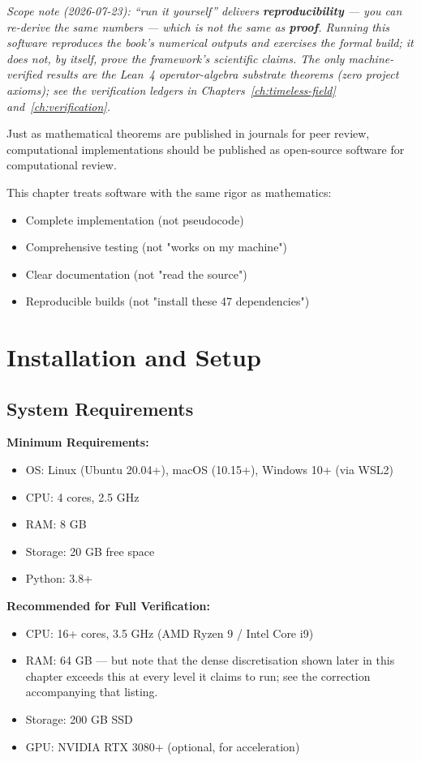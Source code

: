 \medskip
\noindent\emph{Scope note (2026-07-23): ``run it yourself'' delivers \textbf{reproducibility} --- you can re-derive the same numbers --- which is not the same as \textbf{proof}. Running this software reproduces the book's numerical outputs and exercises the formal build; it does not, by itself, prove the framework's scientific claims. The only machine-verified results are the Lean~4 operator-algebra substrate theorems (zero project axioms); see the verification ledgers in Chapters~\ref{ch:timeless-field} and~\ref{ch:verification}.}

\begin{keyidea}
Just as mathematical theorems are published in journals for peer review, computational implementations should be published as open-source software for computational review.

This chapter treats software with the same rigor as mathematics:
\begin{itemize}
\item Complete implementation (not pseudocode)
\item Comprehensive testing (not "works on my machine")
\item Clear documentation (not "read the source")
\item Reproducible builds (not "install these 47 dependencies")
\end{itemize}
\end{keyidea}

\section{Installation and Setup}
\label{sec:installation}

\subsection{System Requirements}

\textbf{Minimum Requirements:}
\begin{itemize}
\item OS: Linux (Ubuntu 20.04+), macOS (10.15+), Windows 10+ (via WSL2)
\item CPU: 4 cores, 2.5 GHz
\item RAM: 8 GB
\item Storage: 20 GB free space
\item Python: 3.8+
\end{itemize}

\textbf{Recommended for Full Verification:}
\begin{itemize}
\item CPU: 16+ cores, 3.5 GHz (AMD Ryzen 9 / Intel Core i9)
\item RAM: 64 GB --- but note that the dense discretisation shown later in this
  chapter exceeds this at every level it claims to run; see the correction
  accompanying that listing.
\item Storage: 200 GB SSD
\item GPU: NVIDIA RTX 3080+ (optional, for acceleration)
\end{itemize}

